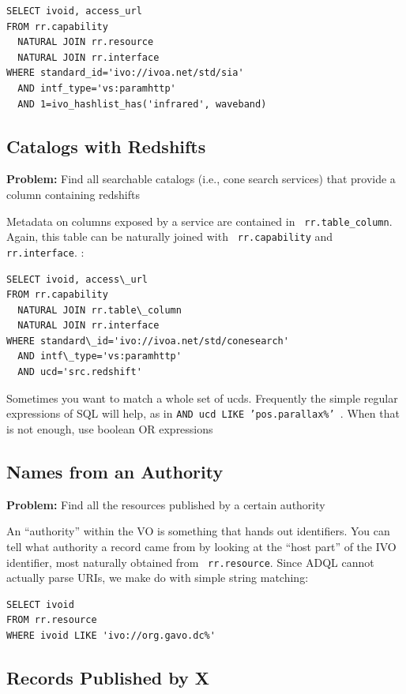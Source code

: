 \documentclass[11pt,a4paper]{ivoa}
\newcommand{\rtent}[1]{\texttt{\color{rtcolor} #1}}
\begin{document}
\begin{verbatim}
SELECT ivoid, access_url 
FROM rr.capability 
  NATURAL JOIN rr.resource
  NATURAL JOIN rr.interface
WHERE standard_id='ivo://ivoa.net/std/sia'
  AND intf_type='vs:paramhttp'
  AND 1=ivo_hashlist_has('infrared', waveband)
\end{verbatim}

\subsection{Catalogs with Redshifts}
\textbf{Problem:} Find all searchable catalogs (i.e., cone search
services) that provide a column containing redshifts

Metadata on columns exposed by a service are contained in 
\rtent{rr.table\_column}.  Again, this table can be
naturally joined with 
\rtent{rr.capability} and 
\rtent{rr.interface}.
:
\begin{verbatim}
SELECT ivoid, access\_url 
FROM rr.capability 
  NATURAL JOIN rr.table\_column
  NATURAL JOIN rr.interface 
WHERE standard\_id='ivo://ivoa.net/std/conesearch'
  AND intf\_type='vs:paramhttp'
  AND ucd='src.redshift'
\end{verbatim}

Sometimes you want to match a whole set of ucds.  Frequently the
simple regular expressions of SQL will help, as in 
\texttt{AND ucd LIKE 'pos.parallax\%' }.  When that is not enough, 
use boolean OR expressions 

\subsection{Names from an Authority}

\textbf{Problem:} Find all the resources published by a certain
authority

An ``authority'' within the VO is something that hands out identifiers.
You can tell what authority a record came from by looking at the ``host
part'' of the IVO identifier, most naturally obtained from 
\rtent{rr.resource}.  Since ADQL cannot actually parse
URIs, we make do with simple string matching:


\begin{verbatim}
SELECT ivoid 
FROM rr.resource
WHERE ivoid LIKE 'ivo://org.gavo.dc%'
\end{verbatim}

\subsection{Records Published by X}
\end{document}
